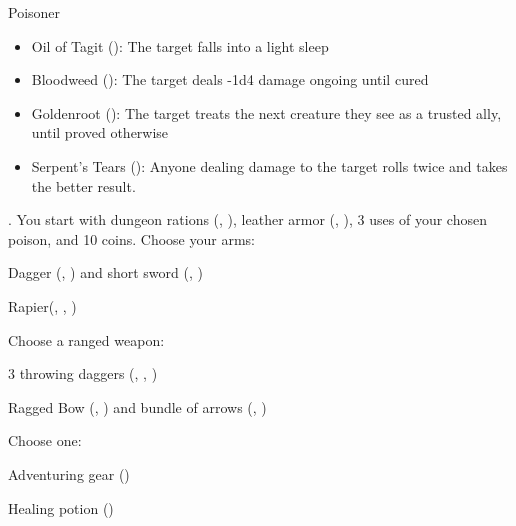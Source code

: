 \documentclass[8pt]{extarticle}
\begin{document}
\begin{minipage}[t]{4.6in}
\begin{basicmove}{Poisoner}
  \begin{itemize}
  \item Oil of Tagit (): The target falls into a light
    sleep
  \item Bloodweed (): The target deals -1d4 damage ongoing
    until cured
  \item Goldenroot (): The target treats the next
    creature they see as a trusted ally, until proved otherwise
  \item Serpent’s Tears (): Anyone dealing damage to the
    target rolls twice and takes the better result.
  \end{itemize}
\end{basicmove}


\vfill\null
\end{minipage}

\charlower

\clearpage

\gearbanner

\begin{multicols}{2}
  . You start with dungeon rations (, ),
  leather armor (, ), 3 uses of your chosen poison,
  and 10 coins. Choose your arms:

  \begin{choices}
  \item Dagger (, ) and short sword
    (, )
  \item Rapier(, , )
  \end{choices}

  Choose a ranged weapon:

  \begin{choices}
  \item 3 throwing daggers (, , )
  \item Ragged Bow (, ) and bundle of arrows
    (, )
  \end{choices}

  Choose one:

  \begin{choices}
  \item Adventuring gear ()
  \item Healing potion ()
  \end{choices}

\columnbreak

\

\end{multicols}
\end{document}
